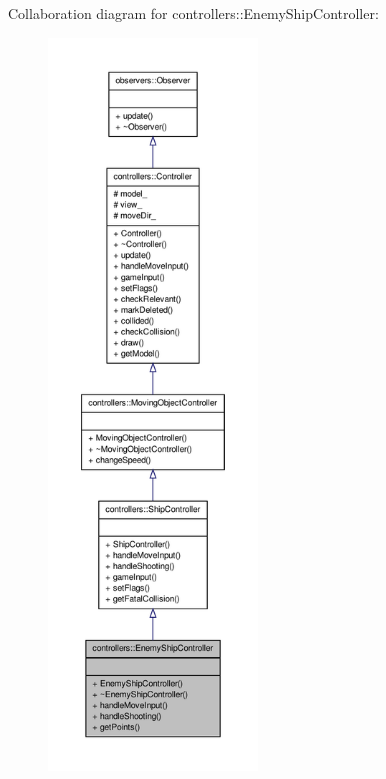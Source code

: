 \-Collaboration diagram for controllers\-:\-:\-Enemy\-Ship\-Controller\-:\nopagebreak
\begin{figure}[H]
\begin{center}
\leavevmode
\includegraphics[height=550pt]{d7/db4/classcontrollers_1_1EnemyShipController__coll__graph}
\end{center}
\end{figure}
